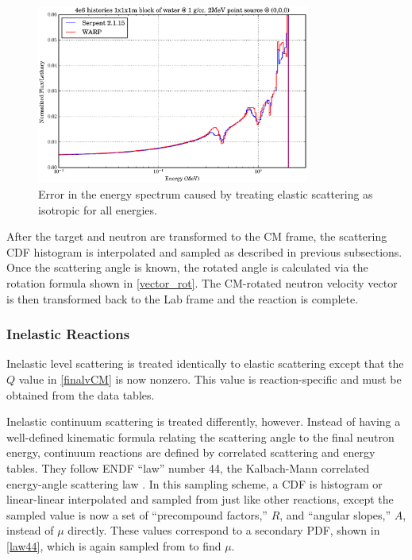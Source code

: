 \begin{figure}[h!] 
  \centering
    \includegraphics[width=0.8\textwidth]{graphics/scattering_error.eps}
     \caption{Error in the energy spectrum caused by treating elastic scattering as isotropic for all energies.\label{scattering_error}}
\end{figure}

After the target and neutron are transformed to the CM frame, the scattering CDF histogram is interpolated and sampled as described in previous subsections. %
 Once the scattering angle is known, the rotated angle is calculated via the rotation formula shown in \eqref{vector_rot}.  The CM-rotated neutron velocity vector is then transformed back to the Lab frame and the reaction is complete.

\subsubsection{Inelastic Reactions}

Inelastic level scattering is treated identically to elastic scattering except that the $Q$ value in \eqref{finalvCM} is now nonzero.  This value is reaction-specific and must be obtained from the data tables.  

Inelastic continuum scattering is treated differently, however.  Instead of having a well-defined kinematic formula relating the scattering angle to the final neutron energy, continuum reactions are defined by correlated scattering and energy tables.  They follow ENDF ``law'' number 44, the Kalbach-Mann correlated energy-angle scattering law \cite{mcnp} \cite{openmc}.  In this sampling scheme, a CDF is histogram or linear-linear interpolated and sampled from just like other reactions, except the sampled value is now a set of ``precompound factors,'' $R$, and ``angular slopes,'' $A$, instead of $\mu$ directly.  These values correspond to a secondary PDF, shown in \eqref{law44}, which is again sampled from to find $\mu$.

